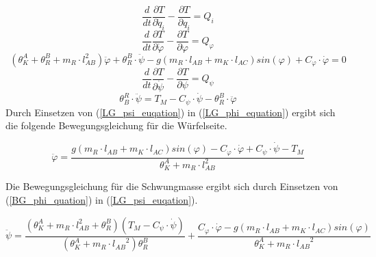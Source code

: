 \begin{equation}
\frac{d}{dt}\frac{\partial T}{\partial \dot{q}_i}-\frac{\partial T}{\partial q_i} = Q_i
\end{equation}
\begin{equation}
\frac{d}{dt}\frac{\partial T}{\partial \dot{\varphi}}-\frac{\partial T}{\partial \varphi} = Q_{\varphi} 
\end{equation}
\begin{equation}
\label{LG_phi_equation}
({\theta}^A_K + {\theta}^B_R + m_R \cdot l_{AB}^2)\ddot{\varphi} + {\theta}^B_R \cdot \ddot{\psi} - g(m_R \cdot l_{AB} + m_K \cdot l_{AC})sin(\varphi) + C_{\varphi} \cdot \dot{\varphi} = 0
\end{equation}
\begin{equation}
\frac{d}{dt}\frac{\partial T}{\partial \dot{\psi}}-\frac{\partial T}{\partial \psi} = Q_{\psi} 
\end{equation}
\begin{equation}
\label{LG_psi_euqation}
{\theta}^R_B \cdot \ddot{\psi} = T_M - C_{\psi} \cdot \dot{\psi} - {\theta}^B_R \cdot \ddot{\varphi}
\end{equation}
\newpage
Durch Einsetzen von (\ref{LG_psi_euqation}) in (\ref{LG_phi_equation}) ergibt sich die folgende Bewegungsgleichung für die Würfelseite.

\begin{equation}
\label{BG_phi_quation}
\ddot{\varphi} = \frac{g(m_R \cdot l_{AB} + m_K \cdot l_{AC})sin(\varphi) - C_{\varphi} \cdot \dot{\varphi} + C_{\psi} \cdot \dot{\psi} - T_M}{{\theta}^A_K + m_R \cdot l_{AB}^2}
\end{equation}

Die Bewegungsgleichung für die Schwungmasse ergibt sich durch Einsetzen von (\ref{BG_phi_quation}) in (\ref{LG_psi_euqation}).

\begin{equation}
\label{BG_psi_equation}
\ddot{\psi} = \frac{({\theta}^A_K + m_R \cdot l_{AB}^2 + {\theta}^B_R)(T_M - C_{\psi} \cdot \dot{\psi})}{({\theta}^A_K + m_R \cdot {l_{AB}}^2){\theta}^B_R} + \frac{C_{\varphi} \cdot \dot{\varphi} - g(m_R \cdot l_{AB} + m_K \cdot l_{AC})sin(\varphi)}{{\theta}^A_K + m_R \cdot {l_{AB}}^2}
\end{equation}